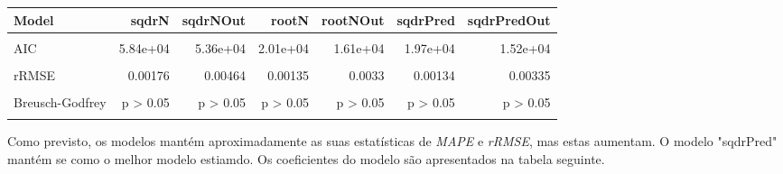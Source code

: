\documentclass[justified, 11pt]{scrartcl}\usepackage[]{graphicx}\usepackage[]{xcolor}
\newenvironment{knitrout}{}{} %
\begin{document}
\begin{knitrout}
\begin{table}
\begin{tabular}{l|r|r|r|r|r|r}
\hline
Model & sqdrN & sqdrNOut & rootN & rootNOut & sqdrPred & sqdrPredOut\\
\hline
\cellcolor{gray!6}{R2} & \cellcolor{gray!6}{0.881} & \cellcolor{gray!6}{0.62} & \cellcolor{gray!6}{0.352} & \cellcolor{gray!6}{0.386} & \cellcolor{gray!6}{0.431} & \cellcolor{gray!6}{0.492}\\
\hline
AIC & 5.84e+04 & 5.36e+04 & 2.01e+04 & 1.61e+04 & 1.97e+04 & 1.52e+04\\
\hline
\cellcolor{gray!6}{MAPE} & \cellcolor{gray!6}{0.128} & \cellcolor{gray!6}{0.127} & \cellcolor{gray!6}{0.0884} & \cellcolor{gray!6}{0.0838} & \cellcolor{gray!6}{0.0875} & \cellcolor{gray!6}{0.0855}\\
\hline
rRMSE & 0.00176 & 0.00464 & 0.00135 & 0.0033 & 0.00134 & 0.00335\\
\hline
\cellcolor{gray!6}{Breusch-Pagan} & \cellcolor{gray!6}{p > 0.05} & \cellcolor{gray!6}{p > 0.05} & \cellcolor{gray!6}{p > 0.05} & \cellcolor{gray!6}{p > 0.05} & \cellcolor{gray!6}{p > 0.05} & \cellcolor{gray!6}{p > 0.05}\\
\hline
Breusch-Godfrey & p > 0.05 & p > 0.05 & p > 0.05 & p > 0.05 & p > 0.05 & p > 0.05\\
\hline
\cellcolor{gray!6}{Jarque-Bera} & \cellcolor{gray!6}{p < 0.05} & \cellcolor{gray!6}{p < 0.05} & \cellcolor{gray!6}{p < 0.05} & \cellcolor{gray!6}{p < 0.05} & \cellcolor{gray!6}{p < 0.05} & \cellcolor{gray!6}{p < 0.05}\\
\hline
\end{tabular}
\endgroup{}
\end{table}

\end{knitrout}
Como previsto, os modelos mantém aproximadamente as suas estatísticas de \textit{MAPE} e \textit{rRMSE}, mas estas aumentam. O modelo "sqdrPred" mantém se como o melhor modelo estiamdo.
Os coeficientes do modelo são apresentados na tabela seguinte.\\
\footnotesize
\end{document}
